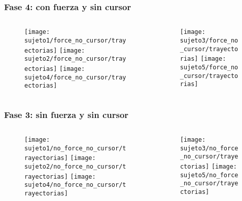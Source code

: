 \begin{frame}
	\frametitle{Fase 4: con fuerza y sin cursor}
	\begin{columns}
		\begin{column}{0.5\textwidth}
			\begin{figure}[t]
				\texttt{[image: sujeto1/force\_no\_cursor/trayectorias]}
				\texttt{[image: sujeto2/force\_no\_cursor/trayectorias]}
				\texttt{[image: sujeto4/force\_no\_cursor/trayectorias]}
			\end{figure}
		\end{column}
		\begin{column}{0.5\textwidth}
			\begin{figure}
				\texttt{[image: sujeto3/force\_no\_cursor/trayectorias]}
				\texttt{[image: sujeto5/force\_no\_cursor/trayectorias]}
			\end{figure}
		\end{column}
	\end{columns}
\end{frame}


\begin{frame}
	\frametitle{Fase 3: sin fuerza y sin cursor}
	\begin{columns}
		\begin{column}{0.5\textwidth}
			\begin{figure}[t]
				\texttt{[image: sujeto1/no\_force\_no\_cursor/trayectorias]}
				\texttt{[image: sujeto2/no\_force\_no\_cursor/trayectorias]}
				\texttt{[image: sujeto4/no\_force\_no\_cursor/trayectorias]}
			\end{figure}
		\end{column}
		\begin{column}{0.5\textwidth}
			\begin{figure}
				\texttt{[image: sujeto3/no\_force\_no\_cursor/trayectorias]}
				\texttt{[image: sujeto5/no\_force\_no\_cursor/trayectorias]}
			\end{figure}
		\end{column}
	\end{columns}
\end{frame}

